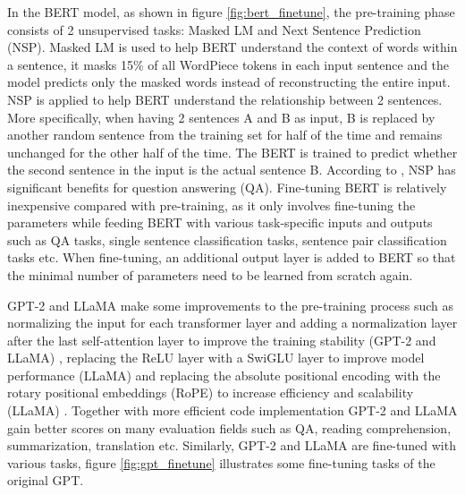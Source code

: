 \documentclass[runningheads]{llncs}
\begin{document}
\noindent \newline
In the BERT model, as shown in figure \ref{fig:bert_finetune}, the pre-training phase consists of 2 unsupervised tasks: Masked LM and Next Sentence Prediction (NSP).
Masked LM is used to help BERT understand the context of words within a sentence, it masks 15\% of all WordPiece tokens in each input sentence and the model 
predicts only the masked words instead of reconstructing the entire input. NSP is applied to help BERT understand the relationship between 2 sentences. More specifically, when 
having 2 sentences A and B as input, B is replaced by another random sentence from the training set for half of the time and remains unchanged for the other half of the time.
The BERT is trained to predict whether the second sentence in the input is the actual sentence B. According to \cite{Devlin18}, NSP has significant benefits for question answering (QA).
Fine-tuning BERT is relatively inexpensive compared with pre-training, as it only involves fine-tuning the parameters while feeding BERT with various task-specific inputs and outputs 
such as QA tasks, single sentence classification tasks, sentence pair classification tasks etc. When fine-tuning, an additional output layer is added to BERT so that the minimal number of 
parameters need to be learned from scratch again.

\noindent \newline
GPT-2 and LLaMA make some improvements to the pre-training process such as normalizing the input for each transformer layer and adding a normalization layer
after the last self-attention layer to improve the training stability (GPT-2 and LLaMA) \cite{Radford19}, replacing the ReLU layer with a SwiGLU layer to improve model performance (LLaMA) and
replacing the absolute positional encoding with the rotary positional embeddings (RoPE) to increase efficiency and scalability (LLaMA) \cite{Touvron23}. Together with more efficient code implementation
GPT-2 and LLaMA gain better scores on many evaluation fields such as QA, reading comprehension, summarization, translation etc. Similarly, GPT-2 and LLaMA are fine-tuned with various tasks,
figure \ref{fig:gpt_finetune} illustrates some fine-tuning tasks of the original GPT.
\end{document}
